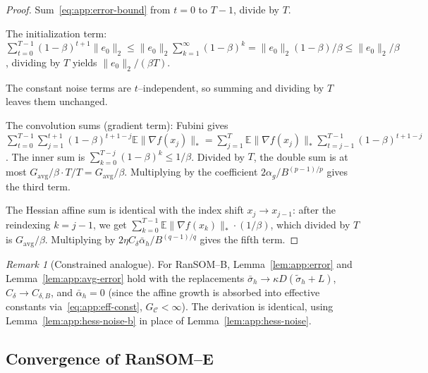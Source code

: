 \documentclass{article}
\theoremstyle{plain}
\theoremstyle{definition}
\theoremstyle{remark}
\newtheorem{remark}[theorem]{Remark}
\begin{document}
\begin{proof}
Sum~\eqref{eq:app:error-bound} from $t = 0$ to $T-1$, divide by $T$.

The initialization term: $\sum_{t=0}^{T-1}(1-\beta)^{t+1}\|e_0\|_2 \leq
\|e_0\|_2\sum_{k=1}^\infty(1-\beta)^k = \|e_0\|_2(1-\beta)/\beta \leq
\|e_0\|_2/\beta$, dividing by $T$ yields $\|e_0\|_2/(\beta T)$.

The constant noise terms are $t$--independent, so summing and dividing
by $T$ leaves them unchanged.

The convolution sums (gradient term): Fubini gives
$\sum_{t=0}^{T-1}\sum_{j=1}^{t+1}(1-\beta)^{t+1-j}\mathbb{E}\|\nabla f(x_j)\|_*
= \sum_{j=1}^{T}\mathbb{E}\|\nabla f(x_j)\|_*
\sum_{t=j-1}^{T-1}(1-\beta)^{t+1-j}$. The inner sum is $\sum_{k=0}^{T-j}
(1-\beta)^k \leq 1/\beta$. Divided by $T$, the double sum is at most
$G_{\mathrm{avg}}/\beta\cdot T/T = G_{\mathrm{avg}}/\beta$. Multiplying
by the coefficient $2\alpha_g/B^{(p-1)/p}$ gives the third term.

The Hessian affine sum is identical with the index shift $x_j \to
x_{j-1}$: after the reindexing $k = j-1$, we get $\sum_{k=0}^{T-1}
\mathbb{E}\|\nabla f(x_k)\|_*\cdot (1/\beta)$, which divided by $T$ is
$G_{\mathrm{avg}}/\beta$. Multiplying by $2\eta C_\delta\bar\alpha_h/
B^{(q-1)/q}$ gives the fifth term.
\end{proof}

\begin{remark}[Constrained analogue]
\label{rem:app:avg-error-b}
For RanSOM--B, Lemma~\ref{lem:app:error} and
Lemma~\ref{lem:app:avg-error} hold with the replacements
$\bar\sigma_h \to \kappa D(\tilde\sigma_h + L)$, $C_\delta \to C_{\delta,B}$,
and $\bar\alpha_h = 0$ (since the affine growth is absorbed into effective
constants via~\eqref{eq:app:eff-const}, $G_\mathcal{C} < \infty$). The
derivation is identical, using Lemma~\ref{lem:app:hess-noise-b} in place
of Lemma~\ref{lem:app:hess-noise}.
\end{remark}


\subsection{Convergence of RanSOM--E}
\label{app:conv-e}
\end{document}
